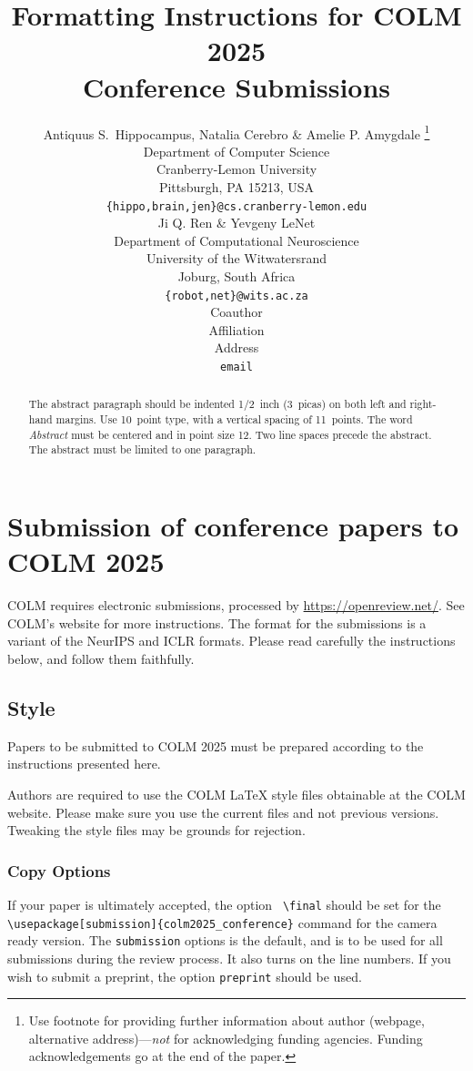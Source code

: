 \documentclass{article} %
\title{Formatting Instructions for COLM 2025 \\ Conference Submissions}
\author{Antiquus S.~Hippocampus, Natalia Cerebro \& Amelie P. Amygdale \thanks{ Use footnote for providing further information
about author (webpage, alternative address)---\emph{not} for acknowledging
funding agencies.  Funding acknowledgements go at the end of the paper.} \\
Department of Computer Science\\
Cranberry-Lemon University\\
Pittsburgh, PA 15213, USA \\
\texttt{\{hippo,brain,jen\}@cs.cranberry-lemon.edu} \\
\And
Ji Q. Ren \& Yevgeny LeNet \\
Department of Computational Neuroscience \\
University of the Witwatersrand \\
Joburg, South Africa \\
\texttt{\{robot,net\}@wits.ac.za} \\
\AND
Coauthor \\
Affiliation \\
Address \\
\texttt{email}
}
\begin{document}
\ifcolmsubmission
\linenumbers
\fi

\maketitle

\begin{abstract}
The abstract paragraph should be indented 1/2~inch (3~picas) on both left and
right-hand margins. Use 10~point type, with a vertical spacing of 11~points.
The word \textit{Abstract} must be centered and in point size 12. Two
line spaces precede the abstract. The abstract must be limited to one
paragraph.
\end{abstract}

\section{Submission of conference papers to COLM 2025}

COLM requires electronic submissions, processed by
\url{https://openreview.net/}. See COLM's website for more instructions.
The format for the submissions is a variant of the NeurIPS and ICLR formats.
Please read carefully the instructions below, and follow them
faithfully.


\subsection{Style}

Papers to be submitted to COLM 2025 must be prepared according to the
instructions presented here.


Authors are required to use the COLM \LaTeX{} style files obtainable at the
COLM website. Please make sure you use the current files and
not previous versions. Tweaking the style files may be grounds for rejection.

\subsubsection{Copy Options}

If your paper is ultimately accepted, the option {\tt
  {\textbackslash}final} should be set  for the {\tt {\textbackslash}usepackage[submission]\{colm2025\_conference\}} command for the camera ready version. The {\tt submission} options is the default, and is to be used for all submissions during the review process. It also turns on the line numbers. If you wish to submit a preprint, the option {\tt preprint} should be used.
\end{document}
